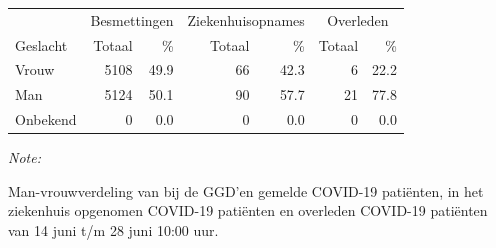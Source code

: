 \documentclass[
  english,
  man,floatsintext]{apa6}
\begin{document}
\begin{table}
\centering\begingroup\fontsize{11}{13}\selectfont

\begin{threeparttable}
\begin{tabular}{lrrrrrr}
\toprule
\multicolumn{1}{c}{ } & \multicolumn{2}{c}{Besmettingen} & \multicolumn{2}{c}{Ziekenhuisopnames} & \multicolumn{2}{c}{Overleden} \\
\cmidrule(l{3pt}r{3pt}){2-3} \cmidrule(l{3pt}r{3pt}){4-5} \cmidrule(l{3pt}r{3pt}){6-7}
Geslacht & Totaal & \% & Totaal & \% & Totaal & \%\\
\midrule
Vrouw & 5108 & 49.9 & 66 & 42.3 & 6 & 22.2\\
Man & 5124 & 50.1 & 90 & 57.7 & 21 & 77.8\\
Onbekend & 0 & 0.0 & 0 & 0.0 & 0 & 0.0\\
\bottomrule
\end{tabular}
\begin{tablenotes}
\item \textit{Note: } 
\item Man-vrouwverdeling van bij de GGD’en gemelde COVID-19 patiënten, in het ziekenhuis opgenomen COVID-19 patiënten en overleden COVID-19 patiënten van 14 juni t/m 28 juni 10:00 uur.
\end{tablenotes}
\end{threeparttable}
\endgroup{}
\end{table}
\newpage
\end{document}

